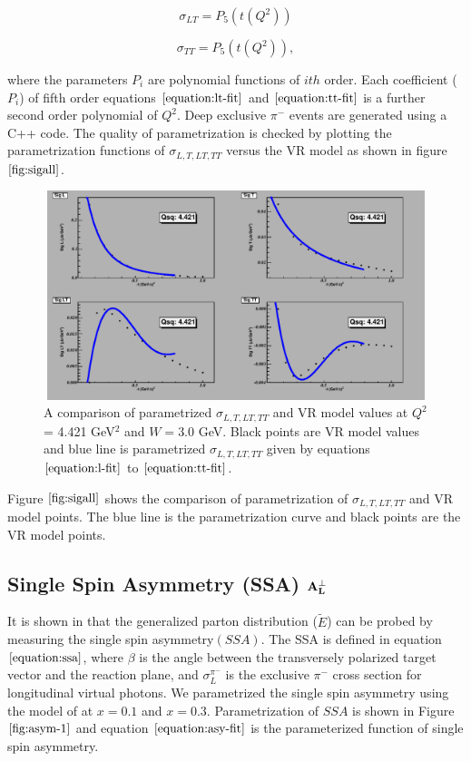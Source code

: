 \begin{equation}
        \sigma_{LT} = P_{5}(t(Q^2))        
     \label{equation:lt-fit}
\end{equation}

\begin{equation}
        \sigma_{TT} = P_{5}(t(Q^2)),        
     \label{equation:tt-fit}
\end{equation}

where the parameters $P_{i}$ are polynomial functions of $ith$ order. Each coefficient ($P_{i}$) of fifth order equations 
$\ref{equation:lt-fit}$ and $\ref{equation:tt-fit}$ is a further second order polynomial of $Q^2$. Deep exclusive $\pi^{-}$ events are 
generated using a C++ code. The quality of parametrization is checked by plotting the parametrization functions of $\sigma_{L,T,LT,TT}$ 
versus the VR model as shown in figure $\ref{fig:sigall}$.

\begin{figure}[!hbt]
    \centering
    \includegraphics[width=6.0in,height=2.4in]{./figures/pimFit.pdf}
    \caption{ A comparison of parametrized $\sigma_{L,T,LT,TT}$ and VR model values at $Q^2$ = 4.421 GeV$^2$ and $W = 3.0$ GeV.  
    Black points are VR model values and blue line is parametrized $\sigma_{L,T,LT,TT}$ given by equations 
    $\ref{equation:l-fit}$ to $\ref{equation:tt-fit}$. }
    \label{fig:sigall}
\end{figure}

Figure $\ref{fig:sigall}$ shows the comparison of parametrization of $\sigma_{L,T,LT,TT}$ and VR model points. The blue line is the 
parametrization curve and black points are the VR model points.

\subsection{Single Spin Asymmetry (SSA) $\bf{A_{L}^{\perp}}$ }
\label{singlespinasymmetry}
It is shown in \cite{frankfurt} that the generalized parton distribution ($\tilde{E}$) can be probed by measuring the single spin 
asymmetry$(SSA)$. The SSA is defined in equation $\ref{equation:ssa}$, where $\beta$ is the angle between the transversely polarized 
target vector and the reaction plane, and $\sigma_{L}^{\pi^{-}}$ is the exclusive $\pi^{-}$ cross section for longitudinal virtual photons. 
We parametrized the single spin asymmetry using the model of \cite{frankfurt} at $x = 0.1$ and $x = 0.3$. Parametrization of $SSA$ 
is shown in Figure $\ref{fig:asym-1}$ and equation $\ref{equation:asy-fit}$ is the parameterized function of single spin asymmetry.

